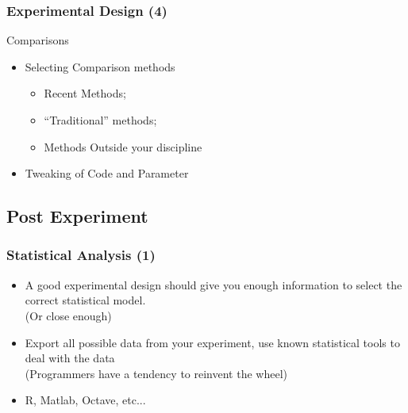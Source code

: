 \documentclass{beamer}
\begin{document}
\begin{frame}
  \frametitle{Experimental Design (4)}
  \begin{block}{Comparisons}
    \begin{itemize}
      \item Selecting Comparison methods
        \begin{itemize}
        \item Recent Methods;
        \item ``Traditional'' methods;
        \item \alert<2>{Methods Outside your discipline}
        \end{itemize}
      \item Tweaking of Code and Parameter
    \end{itemize}
  \end{block}
\end{frame}


\subsection{Post Experiment}
\begin{frame}
  \frametitle{Statistical Analysis (1)}
  \begin{block}{}
    \begin{itemize}
    \item A good experimental design should give you enough
      information to select the correct statistical
      model.\\ {\tiny (Or close enough)}
      \medskip

    \item Export all possible data from your experiment, use known
      statistical tools to deal with the data\\ {\tiny (Programmers
        have a tendency to reinvent the wheel)}
      \medskip

    \item R, Matlab, Octave, etc...
    \end{itemize}    
  \end{block}
\end{frame}
\end{document}
